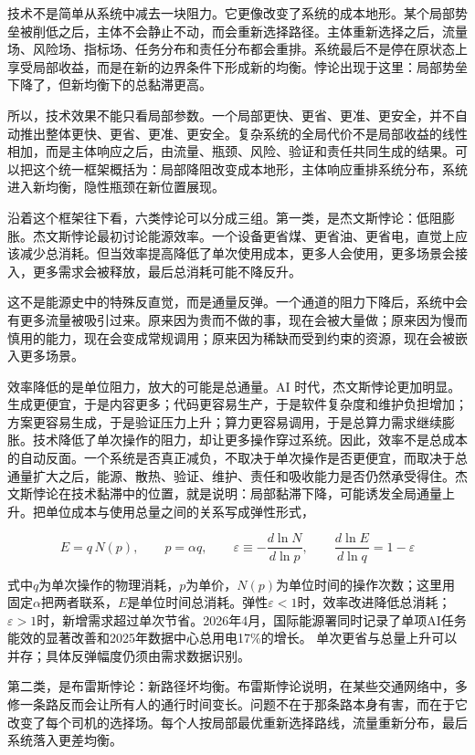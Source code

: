 技术不是简单从系统中减去一块阻力。它更像改变了系统的成本地形。某个局部势垒被削低之后，主体不会静止不动，而会重新选择路径。主体重新选择之后，流量场、风险场、指标场、任务分布和责任分布都会重排。系统最后不是停在原状态上享受局部收益，而是在新的边界条件下形成新的均衡。悖论出现于这里：局部势垒下降了，但新均衡下的总黏滞更高。

所以，技术效果不能只看局部参数。一个局部更快、更省、更准、更安全，并不自动推出整体更快、更省、更准、更安全。复杂系统的全局代价不是局部收益的线性相加，而是主体响应之后，由流量、瓶颈、风险、验证和责任共同生成的结果。可以把这个统一框架概括为：局部降阻改变成本地形，主体响应重排系统分布，系统进入新均衡，隐性瓶颈在新位置展现。

沿着这个框架往下看，六类悖论可以分成三组。第一类，是杰文斯悖论：低阻膨胀。杰文斯悖论最初讨论能源效率。一个设备更省煤、更省油、更省电，直觉上应该减少总消耗。但当效率提高降低了单次使用成本，更多人会使用，更多场景会接入，更多需求会被释放，最后总消耗可能不降反升。\cite{jevons1865coal,allwood2012sustainable}

这不是能源史中的特殊反直觉，而是通量反弹。一个通道的阻力下降后，系统中会有更多流量被吸引过来。原来因为贵而不做的事，现在会被大量做；原来因为慢而慎用的能力，现在会变成常规调用；原来因为稀缺而受到约束的资源，现在会被嵌入更多场景。

效率降低的是单位阻力，放大的可能是总通量。AI 时代，杰文斯悖论更加明显。生成更便宜，于是内容更多；代码更容易生产，于是软件复杂度和维护负担增加；方案更容易生成，于是验证压力上升；算力更容易调用，于是总算力需求继续膨胀。技术降低了单次操作的阻力，却让更多操作穿过系统。因此，效率不是总成本的自动反面。一个系统是否真正减负，不取决于单次操作是否更便宜，而取决于总通量扩大之后，能源、散热、验证、维护、责任和吸收能力是否仍然承受得住。杰文斯悖论在技术黏滞中的位置，就是说明：局部黏滞下降，可能诱发全局通量上升。把单位成本与使用总量之间的关系写成弹性形式，

\begin{equation}
E=q\,N(p),\qquad p=\alpha q,
\qquad
\varepsilon\equiv-\frac{d\ln N}{d\ln p},
\qquad
\frac{d\ln E}{d\ln q}=1-\varepsilon
\end{equation}

式中$q$为单次操作的物理消耗，$p$为单价，$N(p)$为单位时间的操作次数；这里用固定$α$把两者联系，$E$是单位时间总消耗。弹性$ε<1$时，效率改进降低总消耗；$ε>1$时，新增需求超过单次节省。2026年4月，国际能源署同时记录了单项AI任务能效的显著改善和2025年数据中心总用电17\%的增长。\cite{iea2026questions} 单次更省与总量上升可以并存；具体反弹幅度仍须由需求数据识别。

第二类，是布雷斯悖论：新路径坏均衡。布雷斯悖论说明，在某些交通网络中，多修一条路反而会让所有人的通行时间变长。问题不在于那条路本身有害，而在于它改变了每个司机的选择场。每个人按局部最优重新选择路线，流量重新分布，最后系统落入更差均衡。\cite{braess1968}

